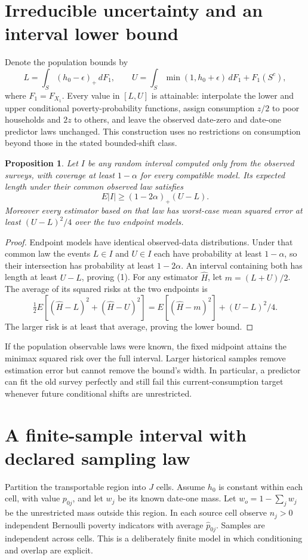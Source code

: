 \documentclass[11pt,a4paper]{article}
\newtheorem{proposition}[theorem]{Proposition}
\begin{document}
\section{Irreducible uncertainty and an interval lower bound}
Denote the population bounds by
\[
 L=\int_S(h_0-\epsilon)_+\,dF_1,\qquad
 U=\int_S\min(1,h_0+\epsilon)\,dF_1+F_1(S^c),
\]
where $F_1=F_{X_1}$. Every value in $[L,U]$ is attainable: interpolate the lower and upper conditional poverty-probability functions, assign consumption $z/2$ to poor households and $2z$ to others, and leave the observed date-zero and date-one predictor laws unchanged. This construction uses no restrictions on consumption beyond those in the stated bounded-shift class.
\begin{proposition}
Let $I$ be any random interval computed only from the observed surveys, with coverage at least $1-\alpha$ for every compatible model. Its expected length under their common observed law satisfies
\[
 E|I|\ge(1-2\alpha)_+(U-L).
\tag{1}
\]
Moreover every estimator based on that law has worst-case mean squared error at least $(U-L)^2/4$ over the two endpoint models.
\end{proposition}
\begin{proof}
Endpoint models have identical observed-data distributions. Under that common law the events $L\in I$ and $U\in I$ each have probability at least $1-\alpha$, so their intersection has probability at least $1-2\alpha$. An interval containing both has length at least $U-L$, proving (1). For any estimator $\widehat H$, let $m=(L+U)/2$. The average of its squared risks at the two endpoints is
\[
 \tfrac12 E[(\widehat H-L)^2+(\widehat H-U)^2]
 =E[(\widehat H-m)^2]+(U-L)^2/4.
\]
The larger risk is at least that average, proving the lower bound.
\end{proof}
If the population observable laws were known, the fixed midpoint attains the minimax squared risk over the full interval. Larger historical samples remove estimation error but cannot remove the bound's width. In particular, a predictor can fit the old survey perfectly and still fail this current-consumption target whenever future conditional shifts are unrestricted.

\section{A finite-sample interval with declared sampling law}
Partition the transportable region into $J$ cells. Assume $h_0$ is constant within each cell, with value $p_{0j}$, and let $w_j$ be its known date-one mass. Let $w_o=1-\sum_jw_j$ be the unrestricted mass outside this region. In each source cell observe $n_j>0$ independent Bernoulli poverty indicators with average $\widehat p_{0j}$. Samples are independent across cells. This is a deliberately finite model in which conditioning and overlap are explicit.
\end{document}
